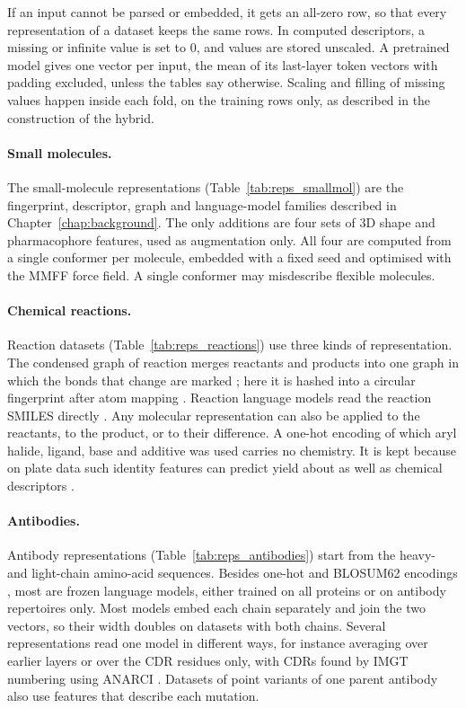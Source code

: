 If an input cannot be parsed or embedded, it gets an all-zero row, so that every representation of a dataset keeps the same rows. In computed descriptors, a missing or infinite value is set to 0, and values are stored unscaled. A pretrained model gives one vector per input, the mean of its last-layer token vectors with padding excluded, unless the tables say otherwise. Scaling and filling of missing values happen inside each fold, on the training rows only, as described in the construction of the hybrid.

\paragraph{Small molecules.} The small-molecule representations (Table~\ref{tab:reps_smallmol}) are the fingerprint, descriptor, graph and language-model families described in Chapter~\ref{chap:background}. The only additions are four sets of 3D shape and pharmacophore features, used as augmentation only. All four are computed from a single conformer per molecule, embedded with a fixed seed and optimised with the MMFF force field. A single conformer may misdescribe flexible molecules.

\paragraph{Chemical reactions.} Reaction datasets (Table~\ref{tab:reps_reactions}) use three kinds of representation. The condensed graph of reaction merges reactants and products into one graph in which the bonds that change are marked \citep{Hoonakker2011}; here it is hashed into a circular fingerprint after atom mapping \citep{Schwaller2021rxnmapper}. Reaction language models read the reaction SMILES directly \citep{Schwaller2021rxnfp, Sagawa2023ReactionT5}. Any molecular representation can also be applied to the reactants, to the product, or to their difference. A one-hot encoding of which aryl halide, ligand, base and additive was used carries no chemistry. It is kept because on plate data such identity features can predict yield about as well as chemical descriptors \citep{Chuang2018}.

\paragraph{Antibodies.} Antibody representations (Table~\ref{tab:reps_antibodies}) start from the heavy- and light-chain amino-acid sequences. Besides one-hot and BLOSUM62 encodings \citep{Henikoff1992}, most are frozen language models, either trained on all proteins or on antibody repertoires only. Most models embed each chain separately and join the two vectors, so their width doubles on datasets with both chains. Several representations read one model in different ways, for instance averaging over earlier layers or over the CDR residues only, with CDRs found by IMGT numbering \citep{Lefranc2003} using ANARCI \citep{Dunbar2016ANARCI}. Datasets of point variants of one parent antibody also use features that describe each mutation.

